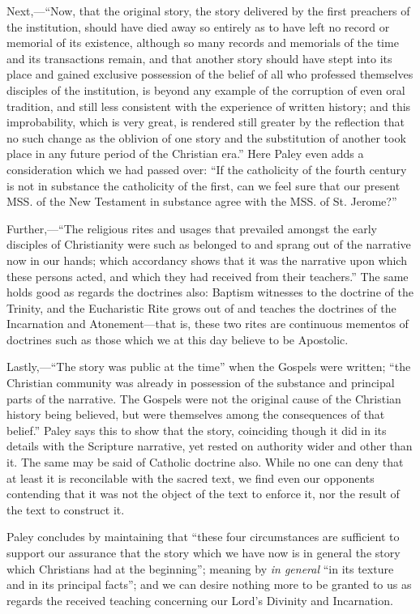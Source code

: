 Next,—``Now, that the original story, the story
delivered by the first preachers of the institution, should have died
away so entirely as to have left no record or memorial of its
existence, although so many records and memorials of the time and its
transactions remain, and that another story should have stept into its
place and gained exclusive possession of the belief of all who
professed themselves disciples of the institution, is beyond any
example of the corruption of even oral tradition, and still less
consistent with the experience of written history; and this
improbability, which is very great, is rendered still greater by the
reflection that no such change as the oblivion of one story and the
substitution of another took place in any future period of the
Christian era.'' Here Paley even adds a consideration which we had
passed over: ``If the catholicity of the fourth century is not in
substance the catholicity of the first, can we feel sure that our
present MSS. of the New Testament in substance agree with the MSS. of
St. Jerome?''

Further,—``The religious rites and usages that
prevailed amongst the early disciples of Christianity were such as
belonged to and sprang out of the narrative now in our hands; which
accordancy shows that it was the narrative upon which these persons
acted, and which they had received from their teachers.'' The same
holds good as regards the doctrines also: Baptism witnesses to the
doctrine of the Trinity, and the Eucharistic Rite grows out of and
teaches the doctrines of the Incarnation and Atonement—that is,
these two rites are continuous mementos of doctrines such as those
which we at this day believe to be Apostolic.

Lastly,—``The story was public at the time'' when
the Gospels were written; ``the Christian community was already in
possession of the substance and principal parts of the narrative. The
Gospels were not the original cause of the Christian history being
believed, but were themselves among the consequences of that belief.''
Paley says this to show that the story, coinciding though it did in
its details with the Scripture narrative, yet rested on authority
wider and other than it. The same may be said of Catholic doctrine
also. While no one can deny that at least it is reconcilable with the
sacred text, we find even our opponents contending that it was not the
object of the text to enforce it, nor the result of the text to
construct it.

Paley concludes by maintaining that ``these four
circumstances are sufficient to support our assurance that the story
which we have now is in general the story which Christians had at the
beginning''; meaning by \emph{in general} ``in its texture and in its
principal facts''; and we can desire nothing more to be granted to us
as regards the received teaching concerning our Lord's Divinity and
Incarnation.

